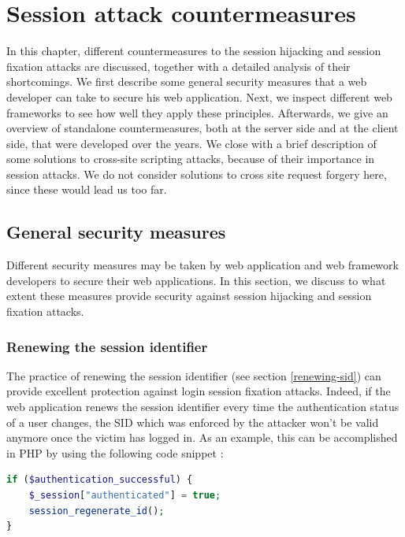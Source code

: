 \chapter{Session attack countermeasures}

In this chapter, different countermeasures to the session hijacking and session fixation attacks are discussed, together with a detailed analysis of their shortcomings. We first describe some general security measures that a web developer can take to secure his web application. Next, we inspect different web frameworks to see how well they apply these principles. Afterwards, we give an overview of standalone countermeasures, both at the server side and at the client side, that were developed over the years. We close with a brief description of some solutions to cross-site scripting attacks, because of their importance in session attacks. We do not consider solutions to cross site request forgery here, since these would lead us too far.

\section{General security measures}\label{general-security}

Different security measures may be taken by web application and web framework developers to secure their web applications. In this section, we discuss to what extent these measures provide security against session hijacking and session fixation attacks.

\subsection{Renewing the session identifier}\label{renewing}

The practice of renewing the session identifier (see section \ref{renewing-sid}) can provide excellent protection against \gls{login session fixation} attacks. Indeed, if the web application renews the session identifier every time the authentication status of a user changes, the SID which was enforced by the attacker won't be valid anymore once the victim has logged in. As an example, this can be accomplished in PHP by using the following code snippet \cite{PHPregenerate,Johns2011}:

\begin{lstlisting}[language=PHP]
if ($authentication_successful) {
    $_session["authenticated"] = true;
    session_regenerate_id();
}
\end{lstlisting}

